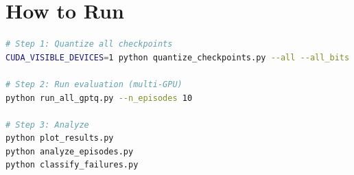 \documentclass[11pt,a4paper]{article}
\begin{document}
\section{How to Run}

\begin{lstlisting}[language=bash]
# Step 1: Quantize all checkpoints
CUDA_VISIBLE_DEVICES=1 python quantize_checkpoints.py --all --all_bits

# Step 2: Run evaluation (multi-GPU)
python run_all_gptq.py --n_episodes 10

# Step 3: Analyze
python plot_results.py
python analyze_episodes.py
python classify_failures.py
\end{lstlisting}
\end{document}
